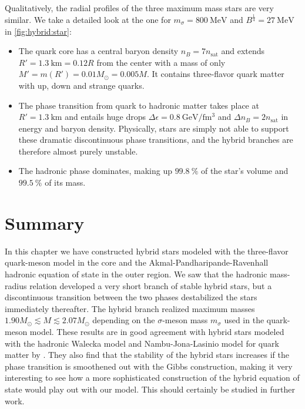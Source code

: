 Qualitatively, the radial profiles of the three maximum mass stars are very similar.
We take a detailed look at the one for $m_\sigma=\SI{800}{\mega\electronvolt}$ and $B^\frac14 = \SI{27}{\mega\electronvolt}$ in \cref{fig:hybrid:star}:
\begin{itemize}
\item The quark core has a central baryon density $n_B = 7 n_\text{sat}$ and extends $R'=\SI{1.3}{\kilo\meter} = 0.12 R$ from the center with a mass of only $M' = m(R') = 0.01 M_\odot = 0.005 M$.
      It contains three-flavor quark matter with up, down and strange quarks.
\item The phase transition from quark to hadronic matter takes place at $R'=\SI{1.3}{\kilo\meter}$ and entails huge drops $\Delta\epsilon = \SI{0.8}{\giga\electronvolt\per\femto\meter\cubed}$ and $\Delta n_B = 2 n_\text{sat}$ in energy and baryon density.
      Physically, stars are simply not able to support these dramatic discontinuous phase transitions, and the hybrid branches are therefore almost purely unstable.
\item The hadronic phase dominates, making up $\SI{99.8}{\percent}$ of the star's volume and $\SI{99.5}{\percent}$ of its mass.
\end{itemize}

\section{Summary}

In this chapter we have constructed hybrid stars modeled with the three-flavor quark-meson model in the core
and the Akmal-Pandharipande-Ravenhall hadronic equation of state in the outer region.
We saw that the hadronic mass-radius relation developed a very short branch of stable hybrid stars,
but a discontinuous transition between the two phases destabilized the stars immediately thereafter.
The hybrid branch realized maximum masses $1.90 M_\odot \lesssim M \lesssim 2.07 M_\odot$ depending on the $\sigma$-meson mass $m_\sigma$ used in the quark-meson model.
These results are in good agreement with hybrid stars modeled with the hadronic Walecka model and Nambu-Jona-Lasinio model for quark matter by \cite{ref:hybrid_stars_njl}.
They also find that the stability of the hybrid stars increases if the phase transition is smoothened out with the Gibbs construction,
making it very interesting to see how a more sophisticated construction of the hybrid equation of state would play out with our model.
This should certainly be studied in further work.

